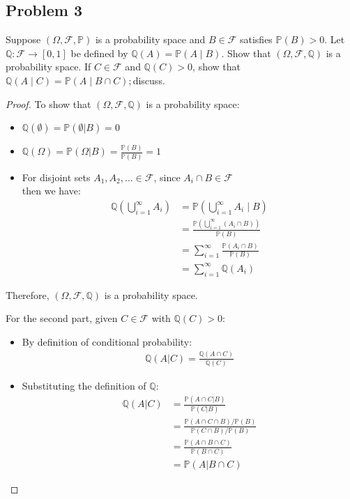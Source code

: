 \documentclass[letterpaper, 11pt]{article}
\newcommand{\1}{\mathds{1}}	%
\theoremstyle{definition}
\begin{document}
\subsection*{Problem 3}
Suppose $(\Omega,\mathscr{F},\mathbb{P})$ is a probability space and $B\in\mathscr{F}$ satisfies $\mathbb{P}(B)>0.$ Let $\mathbb{Q}:\mathscr{F}\to[0,1]$ be defined by $\mathbb{Q}(A)=\mathbb{P}(A\mid B).$ Show that $(\Omega,\mathscr{F},\mathbb{Q})$ is a probability space. If $C\in\mathscr{F}$ and $\mathbb{Q}(C)>0$, show that $\mathbb{Q}(A\mid C)=\mathbb{P}(A\mid B\cap C);$discuss.
\begin{proof}
  To show that $(\Omega,\mathscr{F},\mathbb{Q})$ is a probability space:
  \begin{itemize}
      \item $\mathbb{Q}(\emptyset) = \mathbb{P}(\emptyset | B) = 0$
      
      \item $\mathbb{Q}(\Omega) = \mathbb{P}(\Omega | B) = \frac{\mathbb{P}(B)}{\mathbb{P}(B)} = 1$
      
      \item  For disjoint sets $A_1, A_2, \ldots \in \mathscr{F}$, since $ A_i\cap B \in \mathscr{F} $ \\
      then we have:
      \begin{align*}
      \mathbb{Q}\left(\bigcup_{i=1}^{\infty} A_i\right) &= \mathbb{P}\left(\bigcup_{i=1}^{\infty} A_i \mid B\right) \\
      &= \frac{\mathbb{P}\left(\bigcup_{i=1}^{\infty} (A_i \cap B)\right)}{\mathbb{P}(B)} \\
      &= \sum_{i=1}^{\infty} \frac{\mathbb{P}(A_i \cap B)}{\mathbb{P}(B)} \\
      &= \sum_{i=1}^{\infty} \mathbb{Q}(A_i)
      \end{align*}
  \end{itemize}
  
  Therefore, $(\Omega,\mathscr{F},\mathbb{Q})$ is a probability space.
  
  For the second part, given $C\in\mathscr{F}$ with $\mathbb{Q}(C)>0$:
  \begin{itemize}
      \item By definition of conditional probability:
      \begin{align*}
      \mathbb{Q}(A | C) = \frac{\mathbb{Q}(A \cap C)}{\mathbb{Q}(C)}
      \end{align*}
      
      \item Substituting the definition of $\mathbb{Q}$:
      \begin{align*}
      \mathbb{Q}(A | C) &= \frac{\mathbb{P}(A \cap C | B)}{\mathbb{P}(C | B)} \\
      &= \frac{\mathbb{P}(A \cap C \cap B)/\mathbb{P}(B)}{\mathbb{P}(C \cap B)/\mathbb{P}(B)} \\
      &= \frac{\mathbb{P}(A \cap B \cap C)}{\mathbb{P}(B \cap C)} \\
      &= \mathbb{P}(A | B \cap C)
      \end{align*}
  \end{itemize}
     
\end{proof}
\end{document}
